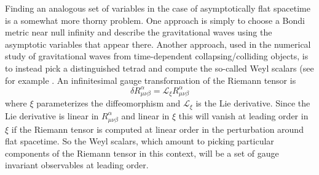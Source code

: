 \documentclass{brownthesis}
\begin{document}
Finding an analogous set of variables in the case of asymptotically
flat spacetime is a somewhat more thorny problem. One approach is
simply to choose a Bondi metric near null infinity \cite{doi:10.1098/rspa.1962.0161,doi:10.1098/rspa.1962.0206}
and describe the gravitational waves using the asymptotic variables
that appear there. Another approach, used in the numerical study of
gravitational waves from time-dependent collapsing/colliding objects,
is to instead pick a distinguished tetrad and compute the so-called
Weyl scalars (see for example \cite{PhysRevD.73.064005,Nerozzi:2016kky}.
An infinitesimal gauge transformation of the Riemann tensor is
\[
\delta R_{\mu\nu\beta}^{\alpha}=\mathcal{L}_{\xi}R_{\mu\nu\beta}^{\alpha}
\]
where $\xi$ parameterizes the diffeomorphism and $\mathcal{L}_{\xi}$
is the Lie derivative. Since the Lie derivative is linear in $R_{\mu\nu\beta}^{\alpha}$
and linear in $\xi$ this will vanish at leading order in $\xi$ if
the Riemann tensor is computed at linear order in the perturbation
around flat spacetime. So the Weyl scalars, which amount to picking
particular components of the Riemann tensor in this context, will
be a set of gauge invariant observables at leading order.
\end{document}
